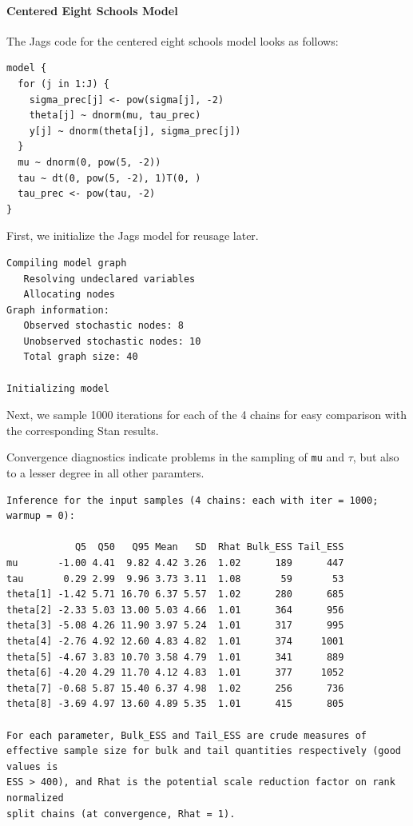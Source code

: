 \documentclass[american,]{article}
\let\oldparagraph\paragraph
\renewcommand{\paragraph}[1]{\oldparagraph{#1}\mbox{}}
\begin{document}
\hypertarget{centered-eight-schools-model-1}{%
\paragraph{Centered Eight Schools
Model}\label{centered-eight-schools-model-1}}

The Jags code for the centered eight schools model looks as follows:

\begin{verbatim}
model {
  for (j in 1:J) {
    sigma_prec[j] <- pow(sigma[j], -2)
    theta[j] ~ dnorm(mu, tau_prec)
    y[j] ~ dnorm(theta[j], sigma_prec[j])
  }
  mu ~ dnorm(0, pow(5, -2))
  tau ~ dt(0, pow(5, -2), 1)T(0, )
  tau_prec <- pow(tau, -2)
}
\end{verbatim}

First, we initialize the Jags model for reusage later.

\begin{verbatim}
Compiling model graph
   Resolving undeclared variables
   Allocating nodes
Graph information:
   Observed stochastic nodes: 8
   Unobserved stochastic nodes: 10
   Total graph size: 40

Initializing model
\end{verbatim}

Next, we sample 1000 iterations for each of the 4 chains for easy
comparison with the corresponding Stan results.

Convergence diagnostics indicate problems in the sampling of \texttt{mu}
and $\tau$, but also to a lesser degree in all other paramters.

\begin{verbatim}
Inference for the input samples (4 chains: each with iter = 1000; warmup = 0):

            Q5  Q50   Q95 Mean   SD  Rhat Bulk_ESS Tail_ESS
mu       -1.00 4.41  9.82 4.42 3.26  1.02      189      447
tau       0.29 2.99  9.96 3.73 3.11  1.08       59       53
theta[1] -1.42 5.71 16.70 6.37 5.57  1.02      280      685
theta[2] -2.33 5.03 13.00 5.03 4.66  1.01      364      956
theta[3] -5.08 4.26 11.90 3.97 5.24  1.01      317      995
theta[4] -2.76 4.92 12.60 4.83 4.82  1.01      374     1001
theta[5] -4.67 3.83 10.70 3.58 4.79  1.01      341      889
theta[6] -4.20 4.29 11.70 4.12 4.83  1.01      377     1052
theta[7] -0.68 5.87 15.40 6.37 4.98  1.02      256      736
theta[8] -3.69 4.97 13.60 4.89 5.35  1.01      415      805

For each parameter, Bulk_ESS and Tail_ESS are crude measures of 
effective sample size for bulk and tail quantities respectively (good values is 
ESS > 400), and Rhat is the potential scale reduction factor on rank normalized
split chains (at convergence, Rhat = 1).
\end{verbatim}
\end{document}
